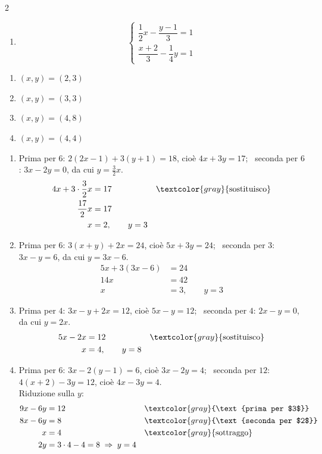 \begin{question}[ID=2.3, subtitle={Sistemi con frazioni in entrambe le equazioni}, difficulty=media, tags={sistemi, equazioni lineari, frazioni}]
\begin{multicols}{2}
\begin{enumerate}[leftmargin=3.2cm]
    \item
    \[
    \begin{cases}
    \dfrac{1}{2}x-\dfrac{y-1}{3}=1\\
    \dfrac{x+2}{3}-\dfrac{1}{4}y=1
    \end{cases}
    \]
\end{enumerate}
\end{multicols}
\begin{solution}
\begin{enumerate}
    \item $(x,y)=(2,3)$
    \item $(x,y)=(3,3)$
    \item $(x,y)=(4,8)$
    \item $(x,y)=(4,4)$
\end{enumerate}
\end{solution}
\begin{explanation}
\begin{enumerate}
    \item Prima per $6$: $2(2x-1)+3(y+1)=18$, cioè $4x+3y=17$; \ seconda per $6$: $3x-2y=0$, da cui $y=\tfrac32x$.
    \[\begin{aligned}
    4x+3\cdot\dfrac32x &= 17 && \textcolor{gray}{\text{sostituisco}}\\
    \dfrac{17}{2}x &= 17\\
    x &= 2, \qquad y=3
    \end{aligned}\]
    \item Prima per $6$: $3(x+y)+2x=24$, cioè $5x+3y=24$; \ seconda per $3$: $3x-y=6$, da cui $y=3x-6$.
    \[\begin{aligned}
    5x+3(3x-6) &= 24\\
    14x &= 42\\
    x &= 3, \qquad y=3
    \end{aligned}\]
    \item Prima per $4$: $3x-y+2x=12$, cioè $5x-y=12$; \ seconda per $4$: $2x-y=0$, da cui $y=2x$.
    \[\begin{aligned}
    5x-2x &= 12 && \textcolor{gray}{\text{sostituisco}}\\
    x &= 4, \qquad y=8
    \end{aligned}\]
    \item Prima per $6$: $3x-2(y-1)=6$, cioè $3x-2y=4$; \ seconda per $12$: $4(x+2)-3y=12$, cioè $4x-3y=4$. \\
    Riduzione sulla $y$:
    \[\begin{aligned}
    9x-6y &= 12 && \textcolor{gray}{\text{prima per $3$}}\\
    8x-6y &= 8 && \textcolor{gray}{\text{seconda per $2$}}\\
    x &= 4 && \textcolor{gray}{\text{sottraggo}}\\
    2y &= 3\cdot4-4=8 \;\Rightarrow\; y=4
    \end{aligned}\]
\end{enumerate}
\end{explanation}
\end{question}

